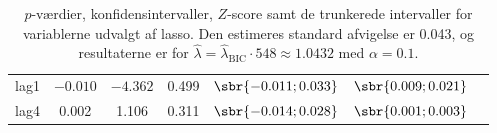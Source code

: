 \begin{table}[h]
{\begin{tabular}{lcccccc}
\textcolor{blue3}{lag1}   & $- 0.010$& $ -4.362$  &0.499  &  $\sbr{-0.011 ; 0.033}$&  $\sbr{0.009           ;    0.021 }$\\
\textcolor{blue3}{lag4}  &0.002 &   1.106  &0.311    & $\sbr{ -0.014;   0.028 }$  & $\sbr{0.001              ; 0.003}$\\
\bottomrule
\end{tabular}  
}
\caption{\(p\)-værdier, konfidensintervaller, $Z$-score samt de trunkerede intervaller for variablerne udvalgt af lasso.  Den estimeres standard afvigelse er 0.043, og resultaterne er for $\widehat{\lambda} = \widehat{\lambda}_\text{BIC} \cdot 548 \approx 1.0432$  med \(\alpha = 0.1\).} \label{tab:fixedLassoInf_bic}
\end{table} 
